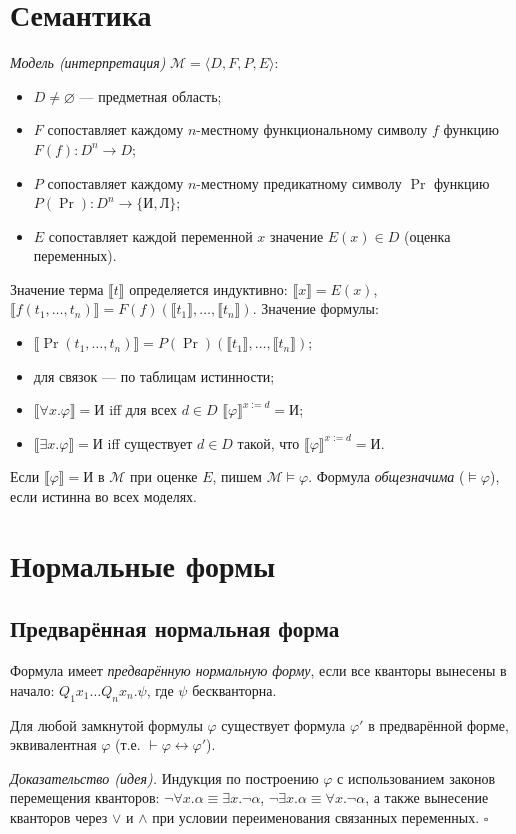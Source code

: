\documentclass[10pt]{article}
\begin{document}
\section{Семантика}
\textit{Модель (интерпретация)} $\mathcal{M}=\langle D, F, P, E\rangle$:
\begin{itemize}
  \item $D\neq\varnothing$ — предметная область;
  \item $F$ сопоставляет каждому $n$-местному функциональному символу $f$ функцию $F(f) : D^n\to D$;
  \item $P$ сопоставляет каждому $n$-местному предикатному символу $\operatorname{Pr}$ функцию $P(\operatorname{Pr}) : D^n\to\{\text{И},\text{Л}\}$;
  \item $E$ сопоставляет каждой переменной $x$ значение $E(x)\in D$ (оценка переменных).
\end{itemize}
Значение терма $\llbracket t\rrbracket$ определяется индуктивно:
$\llbracket x\rrbracket = E(x)$, $\llbracket f(t_1,\dots,t_n)\rrbracket = F(f)(\llbracket t_1\rrbracket,\dots,\llbracket t_n\rrbracket)$.
Значение формулы:
\begin{itemize}
  \item $\llbracket \operatorname{Pr}(t_1,\dots,t_n)\rrbracket = P(\operatorname{Pr})(\llbracket t_1\rrbracket,\dots,\llbracket t_n\rrbracket)$;
  \item для связок — по таблицам истинности;
  \item $\llbracket \forall x.\varphi\rrbracket = \text{И}$ iff для всех $d\in D$ $\llbracket\varphi\rrbracket^{x:=d}=\text{И}$;
  \item $\llbracket \exists x.\varphi\rrbracket = \text{И}$ iff существует $d\in D$ такой, что $\llbracket\varphi\rrbracket^{x:=d}=\text{И}$.
\end{itemize}
Если $\llbracket\varphi\rrbracket=\text{И}$ в $\mathcal{M}$ при оценке $E$, пишем $\mathcal{M}\models\varphi$. Формула \textit{общезначима} ($\models\varphi$), если истинна во всех моделях.

\section{Нормальные формы}
\subsection{Предварённая нормальная форма}
Формула имеет \textit{предварённую нормальную форму}, если все кванторы вынесены в начало: 
$Q_1x_1\dots Q_nx_n.\psi$, где $\psi$ бескванторна.
\begin{theorem}
Для любой замкнутой формулы $\varphi$ существует формула $\varphi'$ в предварённой форме, эквивалентная $\varphi$ (т.е. $\vdash\varphi\leftrightarrow\varphi'$).
\end{theorem}
\textit{Доказательство (идея).} Индукция по построению $\varphi$ с использованием законов перемещения кванторов: $\neg\forall x.\alpha \equiv \exists x.\neg\alpha$, $\neg\exists x.\alpha \equiv \forall x.\neg\alpha$, а также вынесение кванторов через $\vee$ и $\wedge$ при условии переименования связанных переменных. \hfill $\square$
\end{document}
